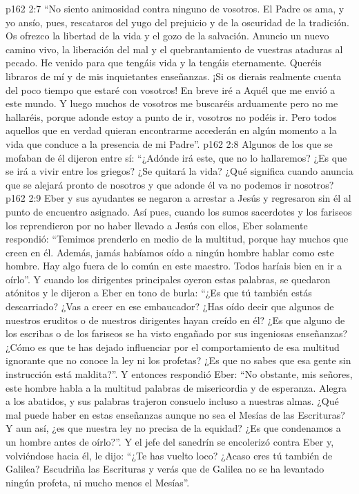 \vs p162 2:7 “No siento animosidad contra ninguno de vosotros. El Padre os ama, y yo ansío, pues, rescataros del yugo del prejuicio y de la oscuridad de la tradición. Os ofrezco la libertad de la vida y el gozo de la salvación. Anuncio un nuevo camino vivo, la liberación del mal y el quebrantamiento de vuestras ataduras al pecado. He venido para que tengáis vida y la tengáis eternamente. Queréis libraros de mí y de mis inquietantes enseñanzas. ¡Si os dierais realmente cuenta del poco tiempo que estaré con vosotros! En breve iré a Aquél que me envió a este mundo. Y luego muchos de vosotros me buscaréis arduamente pero no me hallaréis, porque adonde estoy a punto de ir, vosotros no podéis ir. Pero todos aquellos que en verdad quieran encontrarme accederán en algún momento a la vida que conduce a la presencia de mi Padre”.
\vs p162 2:8 Algunos de los que se mofaban de él dijeron entre sí: “¿Adónde irá este, que no lo hallaremos? ¿Es que se irá a vivir entre los griegos? ¿Se quitará la vida? ¿Qué significa cuando anuncia que se alejará pronto de nosotros y que adonde él va no podemos ir nosotros?
\vs p162 2:9 Eber y sus ayudantes se negaron a arrestar a Jesús y regresaron sin él al punto de encuentro asignado. Así pues, cuando los sumos sacerdotes y los fariseos los reprendieron por no haber llevado a Jesús con ellos, Eber solamente respondió: “Temimos prenderlo en medio de la multitud, porque hay muchos que creen en él. Además, jamás habíamos oído a ningún hombre hablar como este hombre. Hay algo fuera de lo común en este maestro. Todos haríais bien en ir a oírlo”. Y cuando los dirigentes principales oyeron estas palabras, se quedaron atónitos y le dijeron a Eber en tono de burla: “¿Es que tú también estás descarriado? ¿Vas a creer en ese embaucador? ¿Has oído decir que algunos de nuestros eruditos o de nuestros dirigentes hayan creído en él? ¿Es que alguno de los escribas o de los fariseos se ha visto engañado por sus ingeniosas enseñanzas? ¿Cómo es que te has dejado influenciar por el comportamiento de esa multitud ignorante que no conoce la ley ni los profetas? ¿Es que no sabes que esa gente sin instrucción está maldita?”. Y entonces respondió Eber: “No obstante, mis señores, este hombre habla a la multitud palabras de misericordia y de esperanza. Alegra a los abatidos, y sus palabras trajeron consuelo incluso a nuestras almas. ¿Qué mal puede haber en estas enseñanzas aunque no sea el Mesías de las Escrituras? Y aun así, ¿es que nuestra ley no precisa de la equidad? ¿Es que condenamos a un hombre antes de oírlo?”. Y el jefe del sanedrín se encolerizó contra Eber y, volviéndose hacia él, le dijo: “¿Te has vuelto loco? ¿Acaso eres tú también de Galilea? Escudriña las Escrituras y verás que de Galilea no se ha levantado ningún profeta, ni mucho menos el Mesías”.
